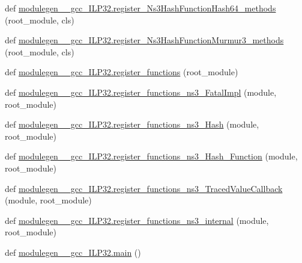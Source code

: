 \begin{DoxyCompactItemize}
\item 
def \hyperlink{namespacemodulegen____gcc__ILP32_a5bb0479ce8e16c48c18c0b8db959d57b}{modulegen\+\_\+\+\_\+gcc\+\_\+\+I\+L\+P32.\+register\+\_\+\+Ns3\+Hash\+Function\+Hash64\+\_\+methods} (root\+\_\+module, cls)
\item 
def \hyperlink{namespacemodulegen____gcc__ILP32_aac40fb7a316e95e431da9cf4c6a3e3a0}{modulegen\+\_\+\+\_\+gcc\+\_\+\+I\+L\+P32.\+register\+\_\+\+Ns3\+Hash\+Function\+Murmur3\+\_\+methods} (root\+\_\+module, cls)
\item 
def \hyperlink{namespacemodulegen____gcc__ILP32_a78223e19764a9a9c4a101c5cff0fe501}{modulegen\+\_\+\+\_\+gcc\+\_\+\+I\+L\+P32.\+register\+\_\+functions} (root\+\_\+module)
\item 
def \hyperlink{namespacemodulegen____gcc__ILP32_afe103c28425c708bef38a8cb16badb60}{modulegen\+\_\+\+\_\+gcc\+\_\+\+I\+L\+P32.\+register\+\_\+functions\+\_\+ns3\+\_\+\+Fatal\+Impl} (module, root\+\_\+module)
\item 
def \hyperlink{namespacemodulegen____gcc__ILP32_a15bbba0d88ee02afb1f5d32d8a94ea14}{modulegen\+\_\+\+\_\+gcc\+\_\+\+I\+L\+P32.\+register\+\_\+functions\+\_\+ns3\+\_\+\+Hash} (module, root\+\_\+module)
\item 
def \hyperlink{namespacemodulegen____gcc__ILP32_a0f9329a49ae57d68c45aee88be7a193f}{modulegen\+\_\+\+\_\+gcc\+\_\+\+I\+L\+P32.\+register\+\_\+functions\+\_\+ns3\+\_\+\+Hash\+\_\+\+Function} (module, root\+\_\+module)
\item 
def \hyperlink{namespacemodulegen____gcc__ILP32_af7ef11aed69cbf420d75dc2f54dcef3d}{modulegen\+\_\+\+\_\+gcc\+\_\+\+I\+L\+P32.\+register\+\_\+functions\+\_\+ns3\+\_\+\+Traced\+Value\+Callback} (module, root\+\_\+module)
\item 
def \hyperlink{namespacemodulegen____gcc__ILP32_a38f99ffef038c5418d70aef09b99e58d}{modulegen\+\_\+\+\_\+gcc\+\_\+\+I\+L\+P32.\+register\+\_\+functions\+\_\+ns3\+\_\+internal} (module, root\+\_\+module)
\item 
def \hyperlink{namespacemodulegen____gcc__ILP32_aadf64690f6ba129a8d42469ea6da5a2d}{modulegen\+\_\+\+\_\+gcc\+\_\+\+I\+L\+P32.\+main} ()
\end{DoxyCompactItemize}
